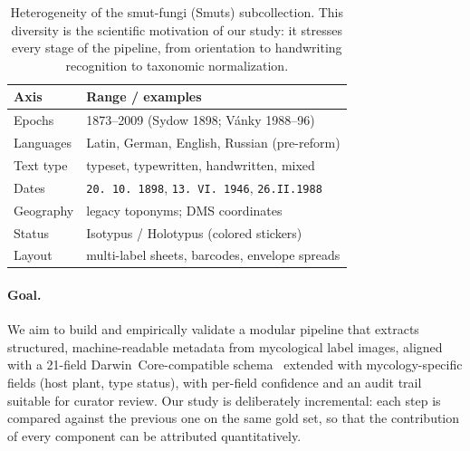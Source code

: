 \begin{table}[t]
\centering
\small
\setlength{\tabcolsep}{4pt}
\begin{tabular}{@{}ll@{}}
\toprule
Axis & Range / examples \\
\midrule
Epochs & 1873--2009 (Sydow 1898; Vánky 1988--96) \\
Languages & Latin, German, English, Russian (pre-reform) \\
Text type & typeset, typewritten, handwritten, mixed \\
Dates & \texttt{20.\,10.\,1898}, \texttt{13.\,VI.\,1946}, \texttt{26.II.1988} \\
Geography & legacy toponyms; DMS coordinates \\
Status & Isotypus / Holotypus (colored stickers) \\
Layout & multi-label sheets, barcodes, envelope spreads \\
\bottomrule
\end{tabular}
\caption{Heterogeneity of the smut-fungi (Smuts) subcollection. This diversity
is the scientific motivation of our study: it stresses every stage of the
pipeline, from orientation to handwriting recognition to taxonomic
normalization.}
\label{tab:corpus}
\end{table}

\paragraph{Goal.}
We aim to build and empirically validate a modular pipeline that extracts
structured, machine-readable metadata from mycological label images, aligned
with a 21-field Darwin~Core-compatible schema~\cite{wieczorek2012dwc} extended
with mycology-specific fields (host plant, type status), with per-field
confidence and an audit trail suitable for curator review. Our study is
deliberately incremental: each step is compared against the previous one on the
same gold set, so that the contribution of every component can be attributed
quantitatively.

